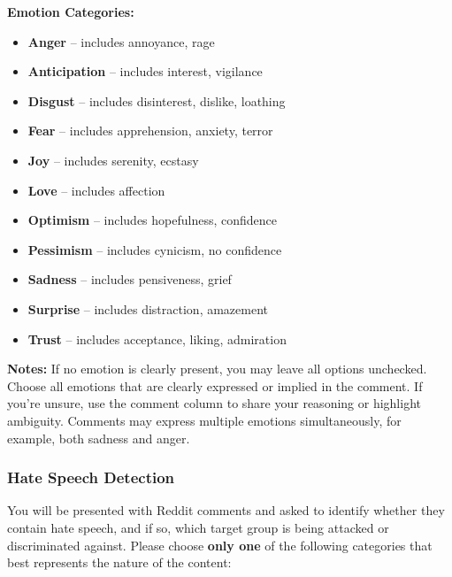 \noindent\textbf{Emotion Categories:}
\begin{itemize}
    \item \textbf{Anger} – includes annoyance, rage
    \item \textbf{Anticipation} – includes interest, vigilance
    \item \textbf{Disgust} – includes disinterest, dislike, loathing
    \item \textbf{Fear} – includes apprehension, anxiety, terror
    \item \textbf{Joy} – includes serenity, ecstasy
    \item \textbf{Love} – includes affection
    \item \textbf{Optimism} – includes hopefulness, confidence
    \item \textbf{Pessimism} – includes cynicism, no confidence
    \item \textbf{Sadness} – includes pensiveness, grief
    \item \textbf{Surprise} – includes distraction, amazement
    \item \textbf{Trust} – includes acceptance, liking, admiration
\end{itemize}


\noindent\textbf{Notes:}
\noindent If no emotion is clearly present, you may leave all options unchecked. Choose all emotions that are clearly expressed or implied in the comment. If you're unsure, use the comment column to share your reasoning or highlight ambiguity. Comments may express multiple emotions simultaneously, for example, both sadness and anger.

\subsubsection*{Hate Speech Detection}
You will be presented with Reddit comments and asked to identify whether they contain hate speech, and if so, which target group is being attacked or discriminated against.
Please choose \textbf{only one} of the following categories that best represents the nature of the content:

